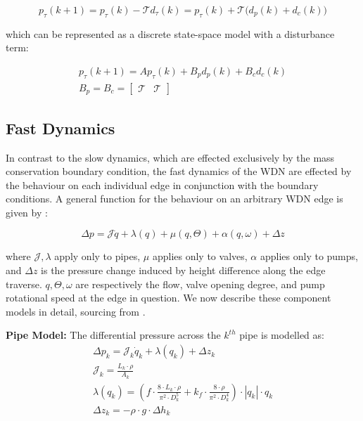 \begin{equation}\label{eq:DiscreteTankPressureDynConProd}
	p_\tau(k+1) = p_\tau(k) - \mathcal{T} d_\tau(k) = p_\tau(k) + \mathcal{T} \Big(d_p(k) + d_c(k)\Big)
\end{equation}

which can be represented as a discrete state-space model with a disturbance term:

\begin{equation}\label{eq:DiscreteTankPressureStateSpace}
	\begin{gathered}
	p_\tau(k+1) = Ap_\tau(k) + B_p d_p(k) + B_cd_c(k) \\ B_p = B_c = \begin{bmatrix}\mathcal{T} & \mathcal{T} \end{bmatrix}
	\end{gathered}
\end{equation}

\subsection{Fast Dynamics}\label{subsec:FastDynamics}

In contrast to the slow dynamics, which are effected exclusively by the mass conservation boundary condition, the fast dynamics of the WDN are effected by the behaviour on each individual edge in conjunction with the boundary conditions. A general function for the behaviour on an arbitrary WDN edge is given by \cite{Jensen}:

\begin{equation}\label{eq:GeneralEdgeModel}
	\Delta p = \mathcal{J}\dot{q} + \lambda(q) + \mu(q,\Theta) + \alpha(q,\omega) + \Delta z
\end{equation}

where $\mathcal{J},\lambda$ apply only to pipes, $\mu$ applies only to valves, $\alpha$ applies only to pumps, and $\Delta z$ is the pressure change induced by height difference along the edge traverse. $q,\Theta,\omega$ are respectively the flow, valve opening degree, and pump rotational speed at the edge in question. We now describe these component models in detail, sourcing from \cite{Swamee2008,Jensen}.

\textbf{Pipe Model:}
The differential pressure across the $ k^{th} $ pipe is modelled as:
\begin{equation}\label{eq:PipeModel}
	\begin{gathered}
		\Delta{p_{k}} = \mathcal{J}_k\dot{q}_k + \lambda(q_k) + \Delta z_k \\ 
		\mathcal{J}_k = \frac{L_k\cdot \rho}{A_k} \\
		\mathcal{\lambda}(q_k) = \left(f \cdot \frac{8\cdot L_k \cdot \rho}{\pi^{2} \cdot D_k^{5}} + k_{f}\cdot \frac{8\cdot \rho}{\pi^{2} \cdot D_k^{4}}\right)\cdot |q_{k}|\cdot q_{k}\\
		\Delta z_k = - \rho \cdot g \cdot \Delta{h_{k}}
	\end{gathered}
\end{equation}

